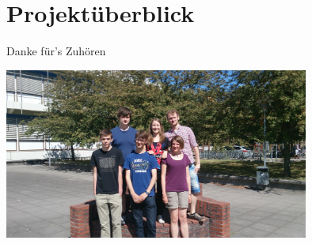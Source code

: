 \section{Projektüberblick}

\begin{frame}{Danke für's Zuhören}
	\begin{center}
		\includegraphics[width=10cm,type=jpg,ext=.jpg,read=.jpg]{media/2014-06-24 10.56.29}
	\end{center}
\end{frame}
